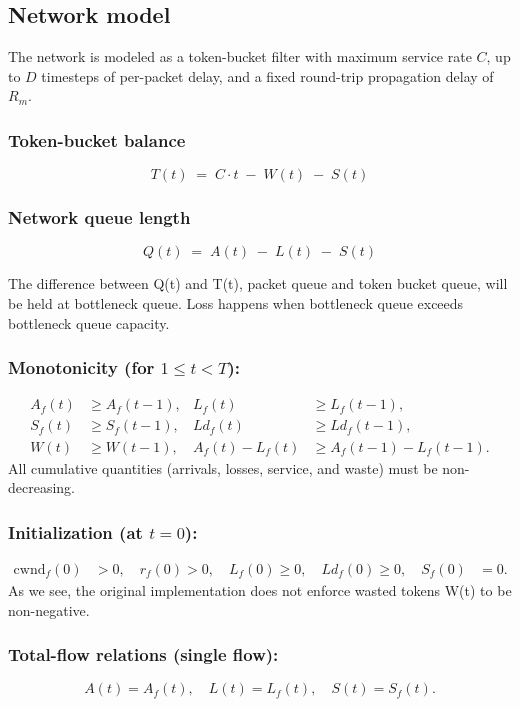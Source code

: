 \documentclass[12pt]{l4dc2023}
\begin{document}
\subsection{Network model}
The network is modeled as a token-bucket filter with maximum service rate $C$, up to $D$ timesteps of per-packet delay, and a fixed round-trip propagation delay of $R_m$.

\subsubsection{Token-bucket balance}
\[
T(t) \;=\; C \cdot t \;-\; W(t) \;-\; S(t)
\]

\subsubsection{Network queue length}
\[
Q(t) \;=\; A(t) \;-\; L(t) \;-\; S(t)
\]

The difference between Q(t) and T(t), packet queue and token bucket queue, will be held at bottleneck queue. Loss happens when bottleneck queue exceeds bottleneck queue capacity. 

\subsubsection{Monotonicity (for \(1\le t<T\)):}
\[
\begin{aligned}
A_f(t)&\ge A_f(t-1), & L_f(t)&\ge L_f(t-1),\\
S_f(t)&\ge S_f(t-1), & Ld_f(t)&\ge Ld_f(t-1),\\
W(t)&\ge W(t-1), & A_f(t)-L_f(t)&\ge A_f(t-1)-L_f(t-1).
\end{aligned}
\]
All cumulative quantities (arrivals, losses, service, and waste) must be non-decreasing.
\subsubsection{Initialization (at \(t=0\)):} \label{w}
\[
\begin{aligned}
\mathrm{cwnd}_f(0)&>0,\quad r_f(0)>0,\quad L_f(0)\ge0,\quad Ld_f(0)\ge0,\quad  S_f(0)&=0.
\end{aligned}
\]
As we see, the original implementation does not enforce wasted tokens W(t) to be non-negative.

\subsubsection{Total-flow relations (single flow):}
\[
A(t)=A_f(t),\quad L(t)=L_f(t),\quad S(t)=S_f(t).
\]
\end{document}
